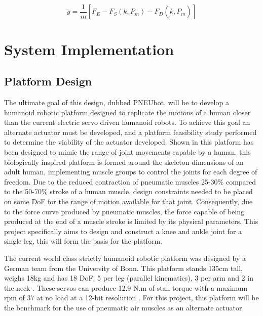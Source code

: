 \documentclass[11pt,a4paper]{article}
\begin{document}
\begin{equation}
    \ddot{y} = \frac{1}{m}[F_E-F_S(k,P_m)-F_D(\dot{k},P_m)]
    \label{math:dynamicforce}
\end{equation}

\newpage
\section{System Implementation}
\label{sec:system_implementation}

\subsection{Platform Design}
\label{sub:platform_design}
The ultimate goal of this design, dubbed PNEUbot, will be to develop a humanoid robotic platform designed to replicate the motions of a human closer than the current electric servo driven humanoid robots. To achieve this goal an alternate actuator must be developed, and a platform feasibility study performed to determine the viability of the actuator developed. Shown in  this platform has been designed to mimic the range of joint movements capable by a human, this biologically inspired platform is formed around the skeleton dimensions of an adult human, implementing muscle groups to control the joints for each degree of freedom. Due to the reduced contraction of pneumatic muscles 25-30\% compared to the 50-70\% stroke of a human muscle, design constraints needed to be placed on some DoF for the range of motion available for that joint. Consequently, due to the force curve produced by pneumatic muscles, the force capable of being produced at the end of a muscle stroke is limited by its physical parameters. This project specifically aims to design and construct a knee and ankle joint for a single leg, this will form the basis for the platform.\newline

The current world class strictly humanoid robotic platform was designed by a German team from the University of Bonn. This platform stands 135cm tall, weighs 18kg and has 18 DoF: 5 per leg (parallel kinematics), 3 per arm and 2 in the neck \cite{ficht_farazi_brandenburger_rodriguez_pavlichenko_allgeuer_hosseini_behnke_2018}. These servos can produce 12.9 N.m of stall torque with a maximum rpm of 37 at no load at a 12-bit resolution \cite{robotis}. For this project, this platform will be the benchmark for the use of pneumatic air muscles as an alternate actuator. \newline
\end{document}
